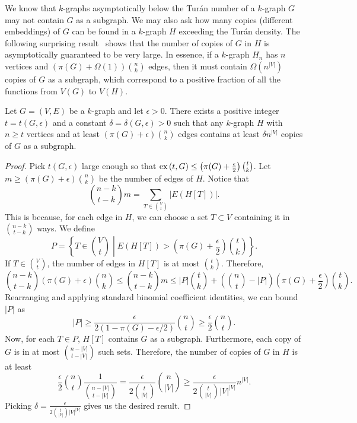 We know that $k$-graphs asymptotically below the Turán number of a $k$-graph $G$
may not contain $G$ as a subgraph.
We may also ask how many copies (different embeddings) of $G$ can be found in a $k$-graph $H$
exceeding the Turán density.
The following surprising result~\cite{erdHos1983supersaturated} shows that the number of copies of $G$ in $H$
is asymptotically guaranteed to be very large.
In essence, if a $k$-graph $H_n$ has $n$ vertices and $\left(\pi(G) + \Omega(1) \right) \binom{n}{k}$ edges,
then it must contain $\Omega\left(n^{|V|}\right)$ copies of $G$ as a subgraph,
which correspond to a positive fraction of all the functions from $V(G)$ to $V(H)$.

\begin{theorem}[Supersaturation] \label{thm:supersaturation}
    Let $G = (V, E)$ be a $k$-graph and let $\epsilon > 0$.
    There exists a positive integer $t = t(G, \epsilon)$ and a constant $\delta = \delta(G, \epsilon) > 0$
    such that any $k$-graph $H$ with $n \geq t$ vertices and at least $\left(\pi(G) + \epsilon \right) \binom{n}{k}$ edges
    contains at least $\delta n^{|V|}$ copies of $G$ as a subgraph.

    \begin{proof}
        Pick $t(G, \epsilon)$ large enough so that
        $\text{ex} \left( t, G \right) \leq \left(\pi(G) + \frac{\epsilon}{2}\right) \binom{t}{k}$.
        Let $m \geq \left(\pi(G) + \epsilon \right) \binom{n}{k}$
        be the number of edges of $H$.
        Notice that
        \[
            \binom{n-k}{t-k}m = \sum_{T \in \binom{V}{t}} |E(H[T])|.
        \]
        This is because, for each edge in $H$, we can choose a set $T \subset V$ containing it in
        $\binom{n-k}{t-k}$ ways.
        We define
        \[
            P = \left\{ T \in \binom{V}{t} \middle| E(H[T]) > \left(\pi(G) + \frac{\epsilon}{2}\right) \binom{t}{k} \right\}.
        \]
        If $T \in \binom{V}{t}$, the number of edges in $H[T]$ is at most $\binom{t}{k}$.
        Therefore,
        \[
            \binom{n-k}{t-k}(\pi(G) + \epsilon)\binom{n}{k}
            \leq \binom{n-k}{t-k}m
            \leq |P| \binom{t}{k} + \left(\binom{n}{t} - |P|\right) \left(\pi(G) + \frac{\epsilon}{2}\right) \binom{t}{k}.
        \]
        Rearranging and applying standard binomial coefficient identities, we can bound $|P|$ as
        \[
            |P| \geq \frac{\epsilon}{2(1 - \pi(G)- \epsilon /2)} \binom{n}{t} \geq \frac{\epsilon}{2} \binom{n}{t}.
        \]
        Now, for each $T \in P$, $H[T]$ contains $G$ as a subgraph.
        Furthermore, each copy of $G$ is in at most $\binom{n - |V|}{t - |V|}$
        such sets.
        Therefore, the number of copies of $G$ in $H$ is at least
        \[
            \frac{\epsilon}{2} \binom{n}{t} \frac{1}{\binom{n - |V|}{t - |V|}}
            = \frac{\epsilon}{2 \binom{t}{|V|}} \binom{n}{|V|}
            \geq \frac{\epsilon}{2 \binom{t}{|V|} |V|^{|V|}} n^{|V|}.
        \]
        Picking $\delta = \frac{\epsilon}{2 \binom{t}{|V|} |V|^{|V|}}$ gives us the desired result.
    \end{proof}
\end{theorem}

